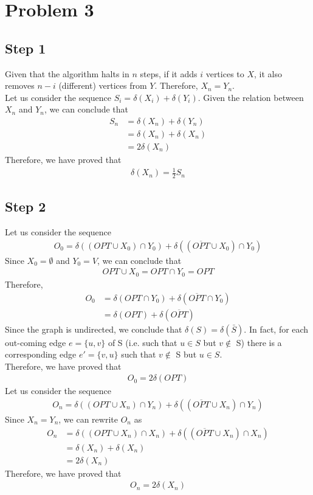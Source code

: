 \documentclass[a4paper,11pt]{article}
\begin{document}
\newpage
\section{Problem 3}

\subsection{Step 1}
Given that the algorithm halts in $n$ steps, if it adds $i$ vertices to $X$, it also removes $n-i$ (different) vertices from $Y$. Therefore, $X_n = Y_n$.\\
Let us consider the sequence $S_i = \delta(X_i) + \delta(Y_i)$. Given the relation between $X_n$ and $Y_n$, we can conclude that
\begin{align*}
S_n &= \delta(X_n) + \delta(Y_n)\\
&= \delta(X_n) + \delta(X_n)\\ 
&= 2\delta(X_n)
\end{align*}
Therefore, we have proved that
\begin{align}
\delta(X_n) = \frac{1}{2}S_n \label{3.1}
\end{align}


\subsection{Step 2}
Let us consider the sequence 
\begin{align*}
O_0 = \delta((OPT \cup X_0) \cap Y_0) + \delta((\overline{OPT} \cup X_0) \cap Y_0)
\end{align*}
Since $X_0 = \emptyset$ and $Y_0 = V$, we can conclude that
\begin{align*}
OPT \cup X_0 = OPT \cap Y_0 = OPT
\end{align*}
Therefore,
\begin{align*}
O_0 &= \delta(OPT \cap Y_0) + \delta(\overline{OPT} \cap Y_0)\\
&= \delta(OPT) + \delta(\overline{OPT})
\end{align*}
Since the graph is undirected, we conclude that $\delta(S) = \delta(\bar S)$. In fact, for each out-coming edge $ e = \{ u,v \} $ of S (i.e. such that $ u \in S$ but $v \not \in$ S) there is a corresponding edge $ e' = \{ v,u \} $ such that  $v \not \in$ S but $ u \in S$.\\ 
Therefore, we have proved that
\begin{align}
O_0 =2 \delta(OPT) \label{3.2}
\end{align}
Let us consider the sequence
\begin{align*}
O_n = \delta((OPT \cup X_n) \cap Y_n) + \delta((\overline{OPT} \cup X_n) \cap Y_n)
\end{align*}
Since $X_n = Y_n$, we can rewrite $O_n$ as
\begin{align*}
O_n &= \delta((OPT \cup X_n) \cap X_n) + \delta((\overline{OPT} \cup X_n) \cap X_n)\\
&= \delta( X_n) + \delta(X_n)\\ 
&= 2\delta(X_n)
\end{align*}
Therefore, we have proved that
\begin{align}
O_n =2 \delta(X_n) \label{3.3}
\end{align}
\end{document}
